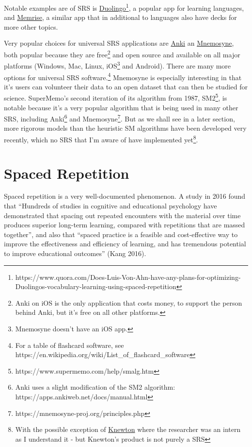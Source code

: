 Notable examples are of SRS is
\href{https://www.duolingo.com}{Duolingo}\footnote{https://www.quora.com/Does-Luis-Von-Ahn-have-any-plans-for-optimizing-Duolingos-vocabulary-learning-using-spaced-repetition},
a popular app for learning languages, and
\href{https://www.memrise.com}{Memrise}, a similar app that in
additional to languages also have decks for more other topics.

Very popular choices for universal SRS applications are
\href{https://apps.ankiweb.net}{Anki} an
\href{https://mnemosyne-proj.org/}{Mnemosyne}, both popular because they
are free\footnote{Anki on iOS is the only application that costs money,
  to support the person behind Anki, but it's free on all other
  platforms.} and open source and available on all major platforms
(Windows, Mac, Linux, iOS\footnote{Mnemosyne doesn't have an iOS app.}
and Android). There are many more options for universal SRS
software.\footnote{For a table of flashcard software, see
  https://en.wikipedia.org/wiki/List\_of\_flashcard\_software} Mnemosyne
is especially interesting in that it's users can volunteer their data to
an open dataset that can then be studied for science. SuperMemo's second
iteration of its algorithm from 1987, SM2\footnote{https://www.supermemo.com/help/smalg.htm},
is notable because it's a very popular algorithm that is being used in
many other SRS, including Anki\footnote{Anki uses a slight modification
  of the SM2 algorithm: https://apps.ankiweb.net/docs/manual.html} and
Mnemosyne\footnote{https://mnemosyne-proj.org/principles.php}. But as we
shall see in a later section, more rigorous models than the heuristic SM
algorithms have been developed very recently, which no SRS that I'm
aware of have implemented yet\footnote{With the possible exception of
  \href{https://www.knewton.com}{Knewton} where the researcher was an
  intern as I understand it - but Knewton's product is not purely a SRS}.

\section{Spaced Repetition}\label{spaced-repetition}

Spaced repetition is a very well-documented phenomenon. A study in 2016
found that ``Hundreds of studies in cognitive and educational psychology
have demonstrated that spacing out repeated encounters with the material
over time produces superior long-term learning, compared with
repetitions that are massed together'', and also that ``spaced practice
is a feasible and cost-effective way to improve the effectiveness and
efficiency of learning, and has tremendous potential to improve
educational outcomes'' (Kang 2016).

